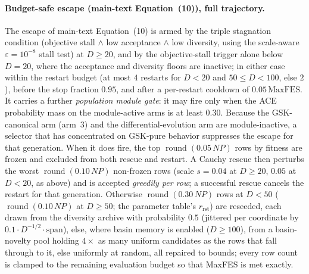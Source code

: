 \documentclass[10pt,a4paper]{article}
\begin{document}
\paragraph{Budget-safe escape (main-text Equation~(10)), full trajectory.}
The escape of main-text Equation~(10) is armed by the triple stagnation condition
(objective stall $\wedge$ low acceptance $\wedge$ low diversity, using the
scale-aware $\varepsilon=10^{-8}$ stall test) at $D\ge 20$, and by the
objective-stall trigger alone below $D=20$, where the acceptance and diversity
floors are inactive; in either case within the restart budget (at most $4$
restarts for $D<20$ and $50\le D<100$, else $2$), before the stop fraction $0.95$, and
after a per-restart cooldown of $0.05\,\mathrm{MaxFES}$.  It carries a further
\emph{population module gate}: it may fire only when the ACE probability mass on the
module-active arms is at least $0.30$.  Because the GSK-canonical arm (arm~3) and the
differential-evolution arm are module-inactive, a selector that has concentrated on
GSK-pure behavior suppresses the escape for that generation.  When it does fire, the
top $\operatorname{round}(0.05\,NP)$ rows by fitness are frozen and excluded from both
rescue and restart.  A Cauchy rescue then perturbs the worst
$\operatorname{round}(0.10\,NP)$ non-frozen rows (scale $s=0.04$ at $D\ge 20$, $0.05$ at
$D<20$, as above) and is accepted \emph{greedily per row}; a successful rescue cancels
the restart for that generation.  Otherwise $\operatorname{round}(0.30\,NP)$ rows at
$D<50$ ($\operatorname{round}(0.10\,NP)$ at $D\ge 50$; the parameter table's
$r_{\text{rst}}$) are reseeded, each drawn from the diversity archive with
probability $0.5$ (jittered per coordinate by $0.1\cdot D^{-1/2}\cdot\mathrm{span}$),
else, where basin memory is enabled ($D\ge 100$), from a basin-novelty pool
holding $4\times$ as many uniform candidates as the rows that fall through to it,
else uniformly at random, all repaired to bounds; every row count is clamped to the
remaining evaluation budget so that MaxFES is met exactly.
\end{document}
